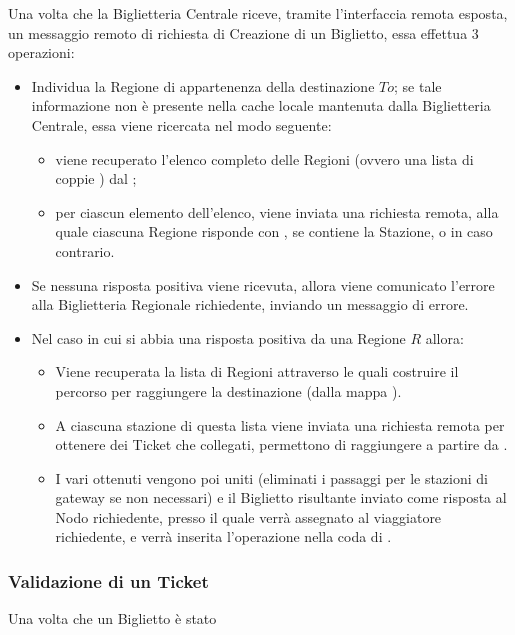 	Una volta che la Biglietteria Centrale riceve, tramite l'interfaccia remota esposta, un messaggio remoto di richiesta di Creazione di un Biglietto, essa effettua 3 operazioni:
	\begin{itemize}
		\item Individua la Regione di appartenenza della destinazione $To$; se tale informazione non è presente nella cache locale mantenuta dalla Biglietteria Centrale, essa viene ricercata nel modo seguente: 
			\begin{itemize}
				\item viene recuperato l'elenco completo delle Regioni (ovvero una lista di coppie ) dal ;
				\item per ciascun elemento dell'elenco, viene inviata una richiesta remota, alla quale ciascuna Regione risponde con , se contiene la Stazione, o  in caso contrario.
			\end{itemize}
		\item Se nessuna risposta positiva viene ricevuta, allora viene comunicato l'errore alla Biglietteria Regionale richiedente, inviando un messaggio di errore.
		\item Nel caso in cui si abbia una risposta positiva da una Regione $R$ allora:
			\begin{itemize}
				\item Viene recuperata la lista di Regioni attraverso le quali costruire il percorso per raggiungere la destinazione (dalla mappa ). 
				\item A ciascuna stazione di questa lista viene inviata una richiesta remota  per ottenere dei Ticket che collegati, permettono di raggiungere  a partire da .
				\item I vari  ottenuti vengono poi uniti (eliminati i passaggi per le stazioni di gateway se non necessari) e il Biglietto risultante inviato come risposta al Nodo richiedente, presso il quale verrà assegnato al viaggiatore richiedente, e verrà inserita l'operazione  nella coda di .
			\end{itemize}
	\end{itemize}
	
	\subsubsection {Validazione di un Ticket}
	
	Una volta che un Biglietto è stato 
